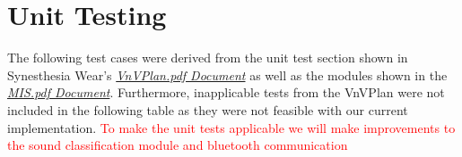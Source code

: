 \documentclass[12pt, titlepage]{article}
\begin{document}
\section{Unit Testing}
The following test cases were derived from the unit test section shown in Synesthesia Wear's \href{https://github.com/jordanbierbrier/capstone/blob/main/docs/VnVPlan/VnVPlan.pdf}{\textit{VnVPlan.pdf Document}} as well as the modules shown in the \href{https://github.com/jordanbierbrier/capstone/blob/main/docs/Design/SoftDetailedDes/MIS.pdf}{\textit{MIS.pdf Document}}.
Furthermore, inapplicable tests from the VnVPlan were not included in the following table as they were not feasible with our current implementation. \textcolor{red}{To make the unit tests applicable we will make improvements to the sound classification module and bluetooth communication} 
\end{document}
